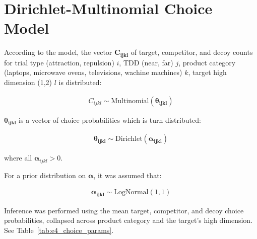 \section{Dirichlet-Multinomial Choice Model}

According to the model, the vector $\boldsymbol{C_{ijkl}}$ of target, competitor, and decoy counts for trial type (attraction, repulsion) $i$, TDD (near, far) $j$, product category (laptops, microwave ovens, televisions, wachine machines)  $k$, target high dimension (1,2) $l$ is distributed:

\begin{align}
    C_{ijkl} \sim \text{Multinomial}(\boldsymbol{\theta_{ijkl}})
\end{align}

$\boldsymbol{\theta_{ijkl}}$ is a vector of choice probabilities which is turn distributed:

\begin{align}
    \boldsymbol{\theta_{ijkl}} \sim \text{Dirichlet}(\boldsymbol{\alpha_{ijkl}})
\end{align}

where all $\boldsymbol{\alpha}_{ijkl}>0$. 

For a prior distribution on $\boldsymbol{\alpha}$, it was assumed that:

\begin{align}
    \boldsymbol{\alpha_{ijkl}} \sim \text{LogNormal}(1,1)
\end{align}

Inference was performed using the mean target, competitor, and decoy choice probabilities, collapsed across product category and the target's high dimension. See Table~\ref{tab:e4_choice_params}.

